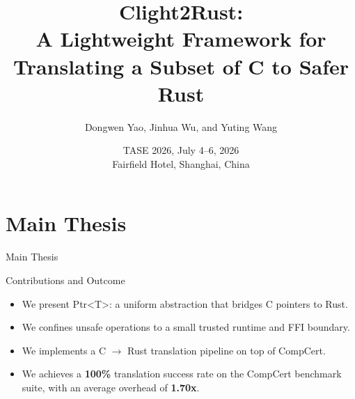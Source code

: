 \documentclass[aspectratio=169,11pt,professionalfonts]{beamer}
\title[\papername{} Presentation]{Clight2Rust:\\A Lightweight Framework for Translating a Subset of C to Safer Rust}
\author{Dongwen Yao, Jinhua Wu, and Yuting Wang}
\institute{Shanghai Jiao Tong University}
\date{TASE 2026, July 4--6, 2026\\Fairfield Hotel, Shanghai, China}
\newcommand{\ptr}{\texttt{Ptr<T>}}
\newcommand{\good}[1]{\textcolor{SJTUBlue}{#1}}
\begin{document}
\begin{frame}
  \titlepage
\end{frame}

\section{Main Thesis}

\begin{frame}{Main Thesis}


  \begin{alertblock}{Contributions and Outcome}
    \begin{itemize}
      \item We present Ptr<T>: a uniform abstraction that bridges C pointers to Rust.
      \item We confines unsafe operations to a small trusted runtime and FFI boundary.
      \item We implements a C $\rightarrow$ Rust translation pipeline on top of CompCert.
      \item We achieves a \textbf{100\%} translation success rate on the CompCert benchmark suite, with an average overhead of \textbf{1.70x}.
    \end{itemize}
  \end{alertblock}
\end{frame}
\end{document}

